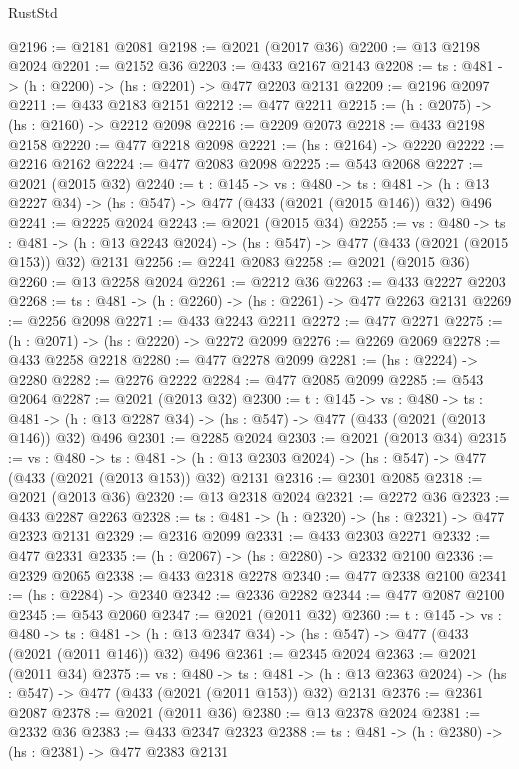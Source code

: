 \begin{lexlean}{RustStd}
\begin{coremodule}
{\begin{coremodule}
{{{{{{{{{{{{{{{{@2196 := @2181 @2081
@2198 := @2021 (@2017 @36)
@2200 := @13 @2198 @2024
@2201 := @2152 @36
@2203 := @433 @2167 @2143
@2208 := {ts : @481} -> (h : @2200) -> (hs : @2201) -> @477 @2203 @2131
@2209 := @2196 @2097
@2211 := @433 @2183 @2151
@2212 := @477 @2211
@2215 := (h : @2075) -> (hs : @2160) -> @2212 @2098
@2216 := @2209 @2073
@2218 := @433 @2198 @2158
@2220 := @477 @2218 @2098
@2221 := (hs : @2164) -> @2220
@2222 := @2216 @2162
@2224 := @477 @2083 @2098
@2225 := @543 @2068
@2227 := @2021 (@2015 @32)
@2240 := {t : @145} ->
  {vs : @480} ->
  {ts : @481} -> (h : @13 @2227 @34) -> (hs : @547) -> @477 (@433 (@2021 (@2015 @146)) @32) @496
@2241 := @2225 @2024
@2243 := @2021 (@2015 @34)
@2255 := {vs : @480} ->
  {ts : @481} -> (h : @13 @2243 @2024) -> (hs : @547) -> @477 (@433 (@2021 (@2015 @153)) @32) @2131
@2256 := @2241 @2083
@2258 := @2021 (@2015 @36)
@2260 := @13 @2258 @2024
@2261 := @2212 @36
@2263 := @433 @2227 @2203
@2268 := {ts : @481} -> (h : @2260) -> (hs : @2261) -> @477 @2263 @2131
@2269 := @2256 @2098
@2271 := @433 @2243 @2211
@2272 := @477 @2271
@2275 := (h : @2071) -> (hs : @2220) -> @2272 @2099
@2276 := @2269 @2069
@2278 := @433 @2258 @2218
@2280 := @477 @2278 @2099
@2281 := (hs : @2224) -> @2280
@2282 := @2276 @2222
@2284 := @477 @2085 @2099
@2285 := @543 @2064
@2287 := @2021 (@2013 @32)
@2300 := {t : @145} ->
  {vs : @480} ->
  {ts : @481} -> (h : @13 @2287 @34) -> (hs : @547) -> @477 (@433 (@2021 (@2013 @146)) @32) @496
@2301 := @2285 @2024
@2303 := @2021 (@2013 @34)
@2315 := {vs : @480} ->
  {ts : @481} -> (h : @13 @2303 @2024) -> (hs : @547) -> @477 (@433 (@2021 (@2013 @153)) @32) @2131
@2316 := @2301 @2085
@2318 := @2021 (@2013 @36)
@2320 := @13 @2318 @2024
@2321 := @2272 @36
@2323 := @433 @2287 @2263
@2328 := {ts : @481} -> (h : @2320) -> (hs : @2321) -> @477 @2323 @2131
@2329 := @2316 @2099
@2331 := @433 @2303 @2271
@2332 := @477 @2331
@2335 := (h : @2067) -> (hs : @2280) -> @2332 @2100
@2336 := @2329 @2065
@2338 := @433 @2318 @2278
@2340 := @477 @2338 @2100
@2341 := (hs : @2284) -> @2340
@2342 := @2336 @2282
@2344 := @477 @2087 @2100
@2345 := @543 @2060
@2347 := @2021 (@2011 @32)
@2360 := {t : @145} ->
  {vs : @480} ->
  {ts : @481} -> (h : @13 @2347 @34) -> (hs : @547) -> @477 (@433 (@2021 (@2011 @146)) @32) @496
@2361 := @2345 @2024
@2363 := @2021 (@2011 @34)
@2375 := {vs : @480} ->
  {ts : @481} -> (h : @13 @2363 @2024) -> (hs : @547) -> @477 (@433 (@2021 (@2011 @153)) @32) @2131
@2376 := @2361 @2087
@2378 := @2021 (@2011 @36)
@2380 := @13 @2378 @2024
@2381 := @2332 @36
@2383 := @433 @2347 @2323
@2388 := {ts : @481} -> (h : @2380) -> (hs : @2381) -> @477 @2383 @2131
}}}}}}}}}}}}}}}}
\end{coremodule}}
\end{coremodule}
\end{lexlean}

